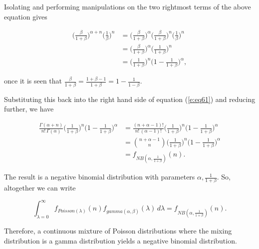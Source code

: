 \documentclass[12pt]{article}
\begin{document}
Isolating and performing manipulations on the two rightmost terms of the above equation gives

\begin{align}
\Big(\frac{\beta}{1 + \beta}\Big)^{\alpha + n} \Big(\frac{1}{\beta}\Big)^n &= \Big(\frac{\beta}{1 + \beta}\Big)^{\alpha} \Big(\frac{\beta}{1 + \beta}\Big)^n \Big(\frac{1}{\beta}\Big)^n \\[5pt]
&= \Big(\frac{\beta}{1 + \beta}\Big)^{\alpha} \Big(\frac{1}{1 + \beta}\Big)^n \\[5pt]
&= \Big(\frac{1}{1 + \beta}\Big)^n \Big(1 - \frac{1}{1 + \beta}\Big)^{\alpha},
\end{align}

once it is seen that $\frac{\beta}{1 + \beta} = \frac{1 + \beta - 1}{1 + \beta} = 1 - \frac{1}{1 - \beta}$.

Substituting this back into the right hand side of equation (\ref{e:eq61}) and reducing further, we have

\begin{align}
\frac{\Gamma(\alpha + n)}{n!\,\Gamma(\alpha)} \Big(\frac{1}{1 + \beta}\Big)^n \Big(1 - \frac{1}{1 + \beta}\Big)^{\alpha} &= \frac{(n + \alpha - 1)!}{n!\,(\alpha - 1)!} \Big(\frac{1}{1 + \beta}\Big)^n \Big(1 - \frac{1}{1 + \beta}\Big)^{\alpha} \\[5pt]
&= \binom{n + \alpha - 1}{n} \Big(\frac{1}{1 + \beta}\Big)^n \Big(1 - \frac{1}{1 + \beta}\Big)^{\alpha} \\[5pt]
&= f_{NB(\alpha,\frac{1}{1 + \beta})}(n).
\end{align}

The result is a negative binomial distribution with parameters $\alpha,\frac{1}{1 + \beta}$. So, altogether we can write

\begin{equation}
\int_{\lambda = 0}^{\infty} f_{Poisson(\lambda)}(n) f_{gamma(\alpha,\beta)}(\lambda) \, d\lambda = f_{NB(\alpha,\frac{1}{1 + \beta})}(n).
\end{equation}

Therefore, a continuous mixture of Poisson distributions where the mixing distribution is a gamma distribution yields a negative binomial distribution.
\end{document}
